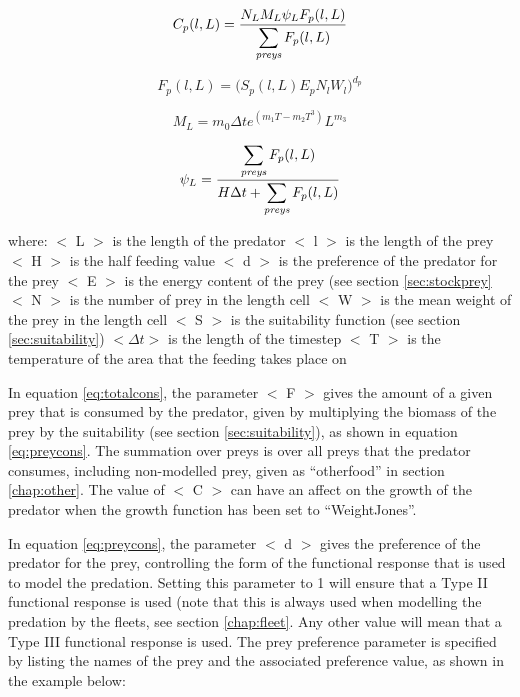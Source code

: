 \documentclass[]{book}
\begin{document}
\begin{equation}
\label{eq:totalcons}
C_{p}(l, L) = \frac{N_{L} M_{L} \psi_{L} F_{p}(l, L)}{\displaystyle \sum_{\it preys} F_{p}(l, L)}\end{equation}

\begin{equation}
\label{eq:preycons}
F_{p}(l, L) =\Big( S_{p}(l, L) E_{p} N_{l} W_{l} \Big) ^{d_{p}}\end{equation}

\begin{equation}
\label{eq:maxcons}
M_{L} = m_{0} \Delta t e^{(m_{1}T - m_{2}T^3)} L^{m_{3}}\end{equation}

\begin{equation}
\label{eq:feedlevel}
\psi_{L} = \frac{\displaystyle \sum_{\it preys} F_{p}(l, L)}{H \Delta t + \displaystyle \sum_{\it preys} F_{p}(l, L)}\end{equation}

where: \(<\) L \(>\) is the length of the predator \(<\) l \(>\) is the length
of the prey \(<\) H \(>\) is the half feeding value \(<\) d \(>\) is the
preference of the predator for the prey \(<\) E \(>\) is the energy content
of the prey (see section \ref{sec:stockprey} \(<\) N \(>\) is the number of prey in the
length cell \(<\) W \(>\) is the mean weight of the prey in the length cell
\(<\) S \(>\) is the suitability function (see
section \ref{sec:suitability}) \(<\Delta t>\) is the length of the timestep
\(<\) T \(>\) is the temperature of the area that the feeding takes place on

In equation \eqref{eq:totalcons}, the parameter \(<\) F \(>\) gives the amount of a
given prey that is consumed by the predator, given by multiplying the
biomass of the prey by the suitability (see
section \ref{sec:suitability}), as shown in
equation \eqref{eq:preycons}. The summation over preys is over all preys
that the predator consumes, including non-modelled prey, given as
``otherfood'' in section \ref{chap:other}. The value of \(<\) C \(>\) can have an affect on
the growth of the predator when the growth function has been set to
``WeightJones''.

In equation \eqref{eq:preycons}, the parameter \(<\) d \(>\) gives the preference
of the predator for the prey, controlling the form of the functional
response that is used to model the predation. Setting this parameter to
1 will ensure that a Type II functional response is used (note that this
is always used when modelling the predation by the fleets, see
section \ref{chap:fleet}.
Any other value will mean that a Type III functional response is used.
The prey preference parameter is specified by listing the names of the
prey and the associated preference value, as shown in the example below:
\end{document}
